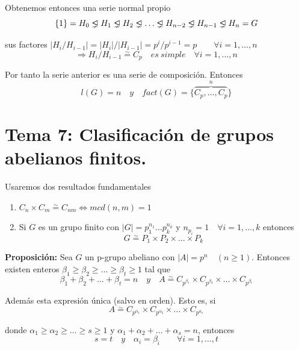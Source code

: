 \documentclass{article}
\newcommand{\unlhdneq}{%
  \mathrel{\ooalign{$\lneq$\cr\raise.22ex\hbox{$\lhd$}\cr}}}
\begin{document}
Obtenemos entonces una serie normal propio
\begin{equation*}
\{1\}=H_0\unlhdneq H_1\unlhdneq H_2\unlhdneq \ldots \unlhdneq H_{n-2}\unlhdneq H_{n-1}\unlhdneq H_n=G
\end{equation*}

sus factores $|H_i/H_{i-1}|=|H_i|/|H_{i-1}|=p^i/p^{i-1}=p\qquad \forall i=1,\ldots,n$
\begin{equation*}
\Rightarrow H_i/H_{i-1}\overset{\sim}{=} C_p\quad es\:simple\quad \forall i=1,\ldots,n
\end{equation*}

Por tanto la serie anterior es una serie de composición. Entonces
\begin{equation*}
l(G)=n\quad y\quad fact(G)=\{\overbrace{C_p,\ldots,C_p}^n\}
\end{equation*}

\section{Tema 7: Clasificación de grupos abelianos finitos.}
Usaremos dos resultados fundamentales
\begin{enumerate}[(1)]
\item $C_n\times C_m\overset{\sim}{=} C_{nm}\Leftrightarrow mcd(n,m)=1$

\item Si $G$ es un grupo finito con $|G|=p_1^{n_1}\ldots p_k^{n_k}$ y $n_{p_i}=1\quad \forall i=1,\ldots,k$ entonces
\begin{equation*}
G\overset{\sim}{=} P_1\times P_2\times \ldots \times P_k
\end{equation*}
\end{enumerate}

\textbf{Proposición:} Sea $G$ un p-grupo abeliano con $|A|=p^n\quad (n\geq 1)$. Entonces existen enteros $\beta_1\geq \beta_2\geq \ldots\geq \beta_t\geq 1$ tal que 
\begin{equation*}
\beta_1+\beta_2+\ldots+\beta_t=n\quad y\quad A\overset{\sim}{=}C_{p^{\beta_1}}\times C_{p^{\beta_2}}\times \ldots \times C_{p^{\beta_t}}
\end{equation*}

Además esta expresión única (salvo en orden). Esto es, si
\begin{equation*}
A\overset{\sim}{=} C_{p^{\alpha_1}}\times C_{p^{\alpha_2}}\times \ldots \times C_{p^{\alpha_s}}
\end{equation*}

donde $\alpha_1\geq \alpha_2\geq \ldots \geq s\geq 1$ y $\alpha_1+\alpha_2+\ldots+\alpha_s=n$, entonces
\begin{equation*}
s=t\quad y\quad \alpha_i=\beta_i \qquad \forall i=1,\ldots,t
\end{equation*}
\end{document}
